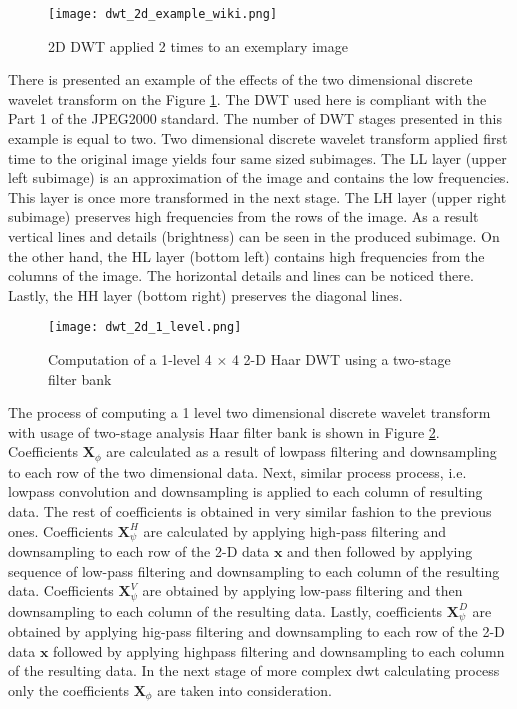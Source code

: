 \begin{figure}
    \centering
    \texttt{[image: dwt\_2d\_example\_wiki.png]}
    \caption{2D DWT applied 2 times to an exemplary image \cite{dwt_example_wiki}}
    \label{fig:dwt_2d_example_wiki}
\end{figure}

There is presented an example of the effects of the two dimensional discrete wavelet transform on the Figure \ref{fig:dwt_2d_example_wiki}.
The DWT used here is compliant with the Part 1 of the JPEG2000 standard. The number of DWT stages presented in this  
example is equal to two. Two dimensional discrete wavelet transform applied first time to the original image
yields four same sized subimages. The LL layer (upper left subimage) is an approximation of the image and contains the low frequencies.
This layer is once more transformed in the next stage. The LH layer (upper right subimage) preserves high frequencies from the rows of the image.
As a result vertical lines and details (brightness) can be seen in the produced subimage. On the other hand, the HL layer (bottom left)
contains high frequencies from the columns of the image. The horizontal details and lines can be noticed there.
Lastly, the HH layer (bottom right) preserves the diagonal lines. \cite{dwt_example_wiki}

\begin{figure}
    \centering
    \texttt{[image: dwt\_2d\_1\_level.png]}
    \caption{Computation of a 1-level 4 $\times$ 4 2-D Haar DWT using a two-stage filter bank \cite{dwt_impl}}
    \label{fig:dwt_2d_1_level}
\end{figure}

The process of computing a 1 level two dimensional discrete wavelet transform with usage of
two-stage analysis Haar filter bank is shown in Figure \ref{fig:dwt_2d_1_level}. Coefficients $\mathbf{X}_{\phi}$
are calculated as a result of lowpass filtering and downsampling to each row of the two dimensional
data. Next, similar process process, i.e. lowpass convolution and downsampling is applied to each column of
resulting data. The rest of coefficients is obtained in very similar fashion to the previous ones.
Coefficients $\mathbf{X}^{H}_{\psi}$ are calculated by applying high-pass filtering and downsampling to each row of the
2-D data $\mathbf{x}$ and then followed by applying sequence of low-pass filtering and downsampling to each
column of the resulting data. Coefficients $\mathbf{X}^{V}_{\psi}$ are obtained by applying low-pass filtering
and then downsampling to each column of the resulting data. Lastly, coefficients $\mathbf{X}^{D}_{\psi}$ are
obtained by applying hig-pass filtering and downsampling to each row of the 2-D data $\mathbf{x}$ followed by
applying highpass filtering and downsampling to each column of the resulting data. In the next stage of more
complex dwt calculating process only the coefficients $\mathbf{X}_{\phi}$ are taken into consideration. \cite{dwt_impl}

